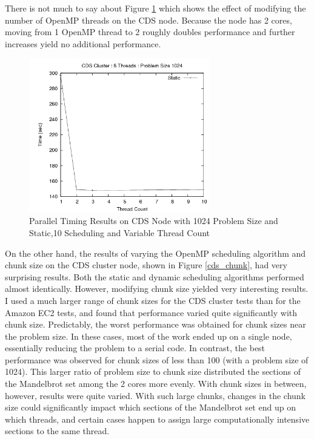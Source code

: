\documentclass{article}
\begin{document}
There is not much to say about Figure \ref{cds_threads} which shows the effect of modifying the number of OpenMP threads on the CDS node. Because the node has 2 cores, moving from 1 OpenMP thread to 2 roughly doubles performance and further increases yield no additional performance.

\begin{figure}
\centering
\includegraphics[width=0.7\textwidth]{../data/cds_threads.png}
\caption{Parallel Timing Results on CDS Node with 1024 Problem Size and Static,10 Scheduling and Variable Thread Count}
\label{cds_threads}
\end{figure}

On the other hand, the results of varying the OpenMP scheduling algorithm and chunk size on the CDS cluster node, shown in Figure \ref{cds_chunk}, had very surprising results. Both the static and dynamic scheduling algorithms performed almost identically. However, modifying chunk size yielded very interesting results. I used a much larger range of chunk sizes for the CDS cluster tests than for the Amazon EC2 tests, and found that performance varied quite significantly with chunk size. Predictably, the worst performance was obtained for chunk sizes near the problem size. In these cases, most of the work ended up on a single node, essentially reducing the problem to a serial code. In contrast, the best performance was observed for chunk sizes of less than 100 (with a problem size of 1024). This larger ratio of problem size to chunk size distributed the sections of the Mandelbrot set among the 2 cores more evenly. With chunk sizes in between, however, results were quite varied. With such large chunks, changes in the chunk size could significantly impact which sections of the Mandelbrot set end up on which threads, and certain cases happen to assign large computationally intensive sections to the same thread.
\end{document}
